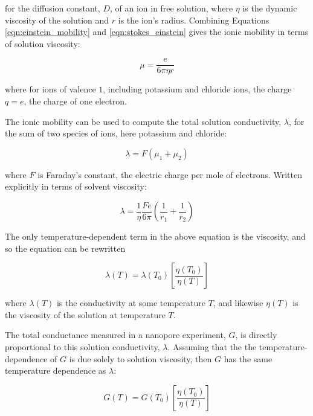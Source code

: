 \noindent
for the diffusion constant, $D$, of an ion in free solution, where $\eta$ is the dynamic viscosity of the solution and $r$ is the ion's radius.  Combining Equations \ref{eqn:einstein_mobility} and \ref{eqn:stokes_einstein} gives the ionic mobility in terms of solution viscosity:

\begin{equation}
\mu = \frac{e}{6 \pi \eta r}
\label{eqn:mobility}
\end{equation}

\noindent
where for ions of valence $1$, including potassium and chloride ions, the charge $q=e$, the charge of one electron.

The ionic mobility can be used to compute the total solution conductivity, $\lambda$, for the sum of two species of ions, here potassium and chloride:

\begin{equation}
\lambda = F(\mu_1 + \mu_2)
\label{eqn:conductivity}
\end{equation}

\noindent
where $F$ is Faraday's constant, the electric charge per mole of electrons.  Written explicitly in terms of solvent viscosity:

\begin{equation}
\lambda = \frac{1}{\eta} \frac{Fe}{6\pi} \left( \frac{1}{r_1}+\frac{1}{r_2} \right)
\label{eqn:conductivity_eta}
\end{equation}

The only temperature-dependent term in the above equation is the viscosity, and so the equation can be rewritten

\begin{equation}
\lambda(T) = \lambda(T_0) \left[ \frac{\eta(T_0)}{\eta(T)} \right]
\label{eqn:conductivity_temp}
\end{equation}

\noindent
where $\lambda(T)$ is the conductivity at some temperature $T$, and likewise $\eta(T)$ is the viscosity of the solution at temperature $T$.

The total conductance measured in a nanopore experiment, $G$, is directly proportional to this solution conductivity, $\lambda$.  Assuming that the the temperature-dependence of $G$ is due solely to solution viscosity, then $G$ has the same temperature dependence as $\lambda$:

\begin{equation}
G(T) = G(T_0) \left[ \frac{\eta(T_0)}{\eta(T)} \right]
\label{eqn:conductance_temp}
\end{equation}

